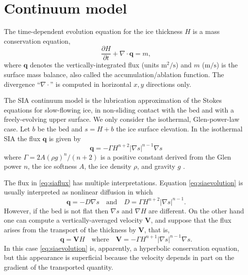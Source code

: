 \documentclass[twocolumn]{igs}
\newcommand\bq{\mathbf{q}}
\newcommand\bV{\mathbf{V}}
\newcommand{\Div}{\nabla\cdot}
\newcommand{\grad}{\nabla}
\begin{document}
\section*{Continuum model}

The time-dependent evolution equation for the ice thickness $H$ is a mass conservation equation,
\begin{equation}
\frac{\partial H}{\partial t} + \Div \bq = m,  \label{eq:siaevolution}
\end{equation}
where $\bq$ denotes the vertically-integrated flux (units $\text{m}^2/\text{s}$) and $m$ ($\text{m}/\text{s}$) is the surface mass balance, also called the accumulation/ablation function.  The divergence ``$\Div$'' is computed in horizontal $x,y$ directions only.

The SIA continuum model is the lubrication approximation \citep{Fowler1997} of the Stokes equations for slow-flowing ice, in non-sliding contact with the bed and with a freely-evolving upper surface.  We only consider the isothermal, Glen-power-law \citep{GreveBlatter2009} case.  Let $b$ be the bed and $s = H+b$ the ice surface elevation.  In the isothermal SIA the flux $\bq$ is given by
\begin{equation}
\bq = - \Gamma H^{n+2} |\grad s|^{n-1} \grad s  \label{eq:siaflux}
\end{equation}
where $\Gamma = 2 A (\rho g)^n / (n+2)$ is a positive constant derived from the Glen power $n$, the ice softness $A$, the ice density $\rho$, and gravity $g$ \citep{Bueleretal2005}.

The flux in \eqref{eq:siaflux} has multiple interpretations.  Equation \eqref{eq:siaevolution} is usually interpreted as nonlinear diffusion in which
\begin{equation}
\bq = - D \grad s \quad \text{and} \quad D =  \Gamma H^{n+2} |\grad s|^{n-1}. \label{eq:siafluxdiffusion}
\end{equation}
However, if the bed is not flat then $\grad s$ and $\grad H$ are different.  On the other hand one can compute a vertically-averaged velocity $\bV$, and suppose that the flux arises from the transport of the thickness by $\bV$, that is,
\begin{equation}
\bq = \bV H \quad \text{where} \quad \bV = - \Gamma H^{n+1} |\grad s|^{n-1} \grad s. \label{eq:siafluxvelocity}
\end{equation}
In this case \eqref{eq:siaevolution} is, apparently, a hyperbolic conservation equation, but this appearance is superficial because the velocity depends in part on the gradient of the transported quantity.
\end{document}

